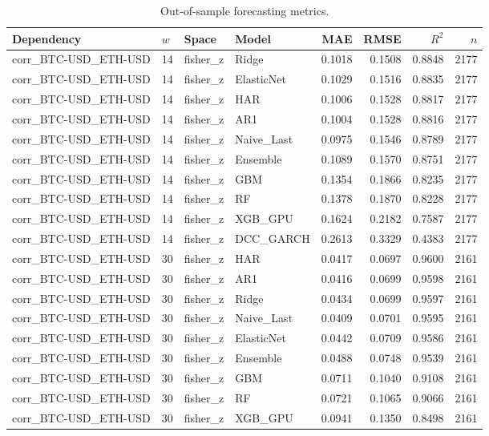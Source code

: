 \begin{table}[H]
\centering
\small
\caption{Out-of-sample forecasting metrics.}
\label{tab:metrics}
\begin{tabular}{llllrrrr}
\toprule
Dependency & $w$ & Space & Model & MAE & RMSE & $R^2$ & $n$ \\
\midrule
corr_BTC-USD_ETH-USD & 14 & fisher_z & Ridge & 0.1018 & 0.1508 & 0.8848 & 2177 \\
corr_BTC-USD_ETH-USD & 14 & fisher_z & ElasticNet & 0.1029 & 0.1516 & 0.8835 & 2177 \\
corr_BTC-USD_ETH-USD & 14 & fisher_z & HAR & 0.1006 & 0.1528 & 0.8817 & 2177 \\
corr_BTC-USD_ETH-USD & 14 & fisher_z & AR1 & 0.1004 & 0.1528 & 0.8816 & 2177 \\
corr_BTC-USD_ETH-USD & 14 & fisher_z & Naive_Last & 0.0975 & 0.1546 & 0.8789 & 2177 \\
corr_BTC-USD_ETH-USD & 14 & fisher_z & Ensemble & 0.1089 & 0.1570 & 0.8751 & 2177 \\
corr_BTC-USD_ETH-USD & 14 & fisher_z & GBM & 0.1354 & 0.1866 & 0.8235 & 2177 \\
corr_BTC-USD_ETH-USD & 14 & fisher_z & RF & 0.1378 & 0.1870 & 0.8228 & 2177 \\
corr_BTC-USD_ETH-USD & 14 & fisher_z & XGB_GPU & 0.1624 & 0.2182 & 0.7587 & 2177 \\
corr_BTC-USD_ETH-USD & 14 & fisher_z & DCC_GARCH & 0.2613 & 0.3329 & 0.4383 & 2177 \\
corr_BTC-USD_ETH-USD & 30 & fisher_z & HAR & 0.0417 & 0.0697 & 0.9600 & 2161 \\
corr_BTC-USD_ETH-USD & 30 & fisher_z & AR1 & 0.0416 & 0.0699 & 0.9598 & 2161 \\
corr_BTC-USD_ETH-USD & 30 & fisher_z & Ridge & 0.0434 & 0.0699 & 0.9597 & 2161 \\
corr_BTC-USD_ETH-USD & 30 & fisher_z & Naive_Last & 0.0409 & 0.0701 & 0.9595 & 2161 \\
corr_BTC-USD_ETH-USD & 30 & fisher_z & ElasticNet & 0.0442 & 0.0709 & 0.9586 & 2161 \\
corr_BTC-USD_ETH-USD & 30 & fisher_z & Ensemble & 0.0488 & 0.0748 & 0.9539 & 2161 \\
corr_BTC-USD_ETH-USD & 30 & fisher_z & GBM & 0.0711 & 0.1040 & 0.9108 & 2161 \\
corr_BTC-USD_ETH-USD & 30 & fisher_z & RF & 0.0721 & 0.1065 & 0.9066 & 2161 \\
corr_BTC-USD_ETH-USD & 30 & fisher_z & XGB_GPU & 0.0941 & 0.1350 & 0.8498 & 2161 \\

\end{tabular}
\end{table}
